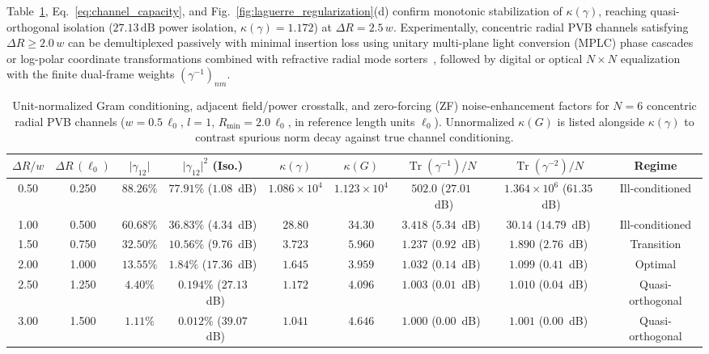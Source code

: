 \documentclass[aps,pra,onecolumn,notitlepage,11pt,tightenlines,amsmath,amssymb,floatfix,longbibliography]{revtex4-2}
\providecommand{\abs}[1]{\lvert#1\rvert}
\begin{document}
Table~\ref{tab:gram_matrix}, Eq.~\eqref{eq:channel_capacity}, and Fig.~\ref{fig:laguerre_regularization}(d) confirm monotonic stabilization of $\kappa(\gamma)$, reaching quasi-orthogonal isolation ($27.13\,\mathrm{dB}$ power isolation, $\kappa(\gamma) = 1.172$) at $\Delta R = 2.5\,w$. Experimentally, concentric radial PVB channels satisfying $\Delta R \ge 2.0\,w$ can be demultiplexed passively with minimal insertion loss using unitary multi-plane light conversion (MPLC) phase cascades~\cite{Fontaine2019} or log-polar coordinate transformations combined with refractive radial mode sorters~\cite{Berkhout2010,Bouchard2018}, followed by digital or optical $N \times N$ equalization with the finite dual-frame weights $(\gamma^{-1})_{nm}$.

\begin{table}[t]
\caption{Unit-normalized Gram conditioning, adjacent field/power crosstalk, and zero-forcing (ZF) noise-enhancement factors for $N = 6$ concentric radial PVB channels ($w = 0.5\,\ell_0$, $l = 1$, $R_{\min} = 2.0\,\ell_0$, in reference length units $\ell_0$). Unnormalized $\kappa(G)$ is listed alongside $\kappa(\gamma)$ to contrast spurious norm decay against true channel conditioning.}
\label{tab:gram_matrix}
\begin{ruledtabular}
\scriptsize
\setlength{\tabcolsep}{2.5pt}
\begin{tabular}{ccccccccc}
$\Delta R / w$ & $\Delta R\,(\ell_0)$ & $\abs{\gamma_{12}}$ & $\abs{\gamma_{12}}^2$ (Iso.) & $\kappa(\gamma)$ & $\kappa(G)$ & $\operatorname{Tr}(\gamma^{-1})/N$ & $\operatorname{Tr}(\gamma^{-2})/N$ & Regime \\
\hline
0.50 & 0.250 & $88.26\%$ & $77.91\%$ ($1.08$~dB) & $1.086\times 10^4$ & $1.123\times 10^4$ & $502.0$ ($27.01$~dB) & $1.364\times 10^6$ ($61.35$~dB) & Ill-conditioned \\
1.00 & 0.500 & $60.68\%$ & $36.83\%$ ($4.34$~dB) & $28.80$ & $34.30$ & $3.418$ ($5.34$~dB) & $30.14$ ($14.79$~dB) & Ill-conditioned \\
1.50 & 0.750 & $32.50\%$ & $10.56\%$ ($9.76$~dB) & $3.723$ & $5.960$ & $1.237$ ($0.92$~dB) & $1.890$ ($2.76$~dB) & Transition \\
2.00 & 1.000 & $13.55\%$ & $1.84\%$ ($17.36$~dB) & $1.645$ & $3.959$ & $1.032$ ($0.14$~dB) & $1.099$ ($0.41$~dB) & Optimal \\
2.50 & 1.250 & $4.40\%$ & $0.194\%$ ($27.13$~dB) & $1.172$ & $4.096$ & $1.003$ ($0.01$~dB) & $1.010$ ($0.04$~dB) & Quasi-orthogonal \\
3.00 & 1.500 & $1.11\%$ & $0.012\%$ ($39.07$~dB) & $1.041$ & $4.646$ & $1.000$ ($0.00$~dB) & $1.001$ ($0.00$~dB) & Quasi-orthogonal \\
\end{tabular}
\end{ruledtabular}
\end{table}
\end{document}
